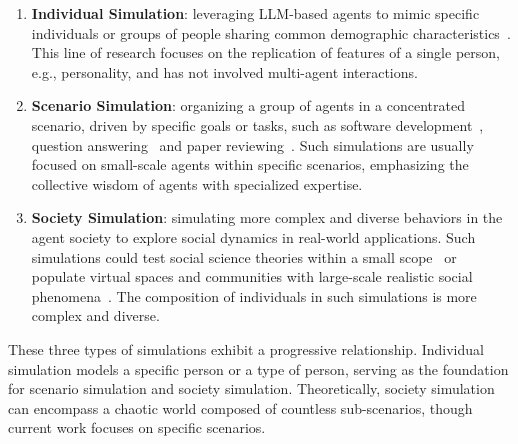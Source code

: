 \begin{enumerate}
    \item \textbf{Individual Simulation}: leveraging LLM-based agents to mimic specific individuals or groups of people sharing common demographic characteristics~\cite{wang2024rolellmbenchmarkingelicitingenhancing,shao2023characterllmtrainableagentroleplaying,chen2024persona}. This line of research focuses on the replication of features of a single person, e.g., personality, and has not involved multi-agent interactions.
    
    \item \textbf{Scenario Simulation}: organizing a group of agents in a concentrated scenario, driven by specific goals or tasks, such as software development~\cite{qian2023communicative,hong2023metagpt}, question answering~\cite{du2023improving} and paper reviewing~\cite{d2024marg}. Such simulations are usually focused on small-scale agents within specific scenarios,  emphasizing the collective wisdom of agents with specialized expertise.
    
    \item \textbf{Society Simulation}: simulating more complex and diverse behaviors in the agent society to explore social dynamics in real-world applications. Such simulations could test social science theories within a small scope~\cite{chuang2024wisdom} or populate virtual spaces and communities with large-scale realistic social phenomena~\cite{park2023generative,yang2024oasis}. The composition of individuals in such simulations is more complex and diverse.
\end{enumerate}

These three types of simulations exhibit a progressive relationship. Individual simulation models a specific person or a type of person, serving as the foundation for scenario simulation and society simulation. Theoretically, society simulation can encompass a chaotic world composed of countless sub-scenarios, though current work focuses on specific scenarios.

